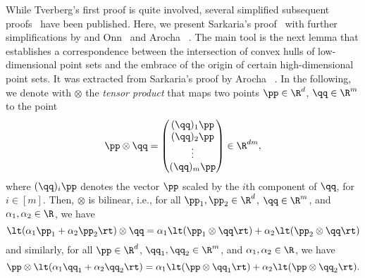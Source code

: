 While Tverberg's first proof is quite involved, several
simplified subsequent 
proofs~\cite{Tverberg1981,TverbergVr1993,Sarkaria1992,Roudneff2001} 
have been published.
Here, we present Sarkaria's proof~\cite{Sarkaria1992} with further
simplifications by \Barany and Onn~\cite{BaranyOn1997} and Arocha
\etal~\cite{ArochaBaBrFaMo2009}.
The main tool is the next lemma that establishes a correspondence 
between the intersection of convex hulls of low-dimensional point sets
and the embrace of the origin of certain high-dimensional
point sets. It was extracted from Sarkaria's proof by Arocha
\etal~\cite{ArochaBaBrFaMo2009}. In the following, we denote with 
$\otimes$ the \emph{tensor product} that maps two points 
$\pp \in \R^d$, $\qq \in \R^m$ to the point
\[
\pp \otimes \qq =
\begin{pmatrix}
  (\qq)_1 \pp \\
  (\qq)_2 \pp \\
  \vdots \\
  (\qq)_m
  \pp
\end{pmatrix} \in \R^{dm},
\]
where $(\qq)_i \pp$ denotes the vector $\pp$ scaled by the $i$th component
of $\qq$, for $i \in [m]$.
Then, $\otimes$ is bilinear, i.e., for all $\pp_1,\pp_2 \in
\R^d$, $\qq \in \R^m$, and $\alpha_1,\alpha_2 \in \R$, we have
\[
\lt(\alpha_1 \pp_1 + \alpha_2 \pp_2\rt) \otimes \qq
= \alpha_1 \lt(\pp_1 \otimes \qq\rt) + \alpha_2 \lt(\pp_2 \otimes \qq\rt)
\]
and similarly, for all $\pp \in \R^d$, $\qq_1,\qq_2 \in \R^m$, and
$\alpha_1,\alpha_2 \in \R$, we have
\[
\pp \otimes \lt(\alpha_1 \qq_1 + \alpha_2 \qq_2\rt)
= \alpha_1 \lt(\pp \otimes \qq_1\rt) + \alpha_2 \lt(\pp \otimes \qq_2\rt).
\]

